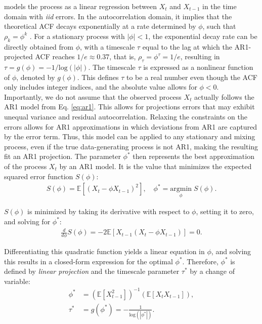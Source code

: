 \documentclass[docs/main.tex]{subfiles}
\begin{document}
\noindent models the process as a linear regression between $X_t$ and $X_{t-1}$ in the time domain with \textit{iid} errors. In the autocorrelation domain, it implies that the theoretical ACF decays exponentially at a rate determined by $\phi$, such that $\rho_k = \phi^k$ \citep[Chapter~14.22]{hansen_econometrics_2022}. For a stationary process with $|\phi|<1$, the exponential decay rate can be directly obtained from $\phi$, with a timescale $\tau$ equal to the lag at which the AR1-projected ACF reaches $1/e\approx 0.37$, that is,  $\rho_\tau = \phi^\tau = 1/e$, resulting in $\tau = g(\phi) = -1/\text{log}(|\phi|)$. The timescale $\tau$ is expressed as a nonlinear function of $\phi$, denoted by $g(\phi)$. This defines $\tau$ to be a real number even though the ACF only includes integer indices, and the absolute value allows for $\phi<0$.\\

Importantly, we do not assume that the observed process $X_t$ actually follows the AR1 model from Eq. \eqref{eq:ar1}. This allows for projections errors that may exhibit unequal variance and residual autocorrelation. Relaxing the constraints on the errors allows for AR1 approximations in which deviations from AR1 are captured by the error term. Thus, this model can be applied to any stationary and mixing process, even if the true data-generating process is not AR1, making the resulting fit an AR1 projection. The parameter $\phi^*$ then represents the best approximation of the process $X_t$ by an AR1 model. It is the value that minimizes the expected squared error function $S(\phi)$:
\begin{align}
    S(\phi) = \mathbb{E}[(X_t - \phi X_{t-1})^2],\quad \phi^* = \underset{\phi}{\text{argmin}} \; S(\phi).
\end{align}

\noindent $S(\phi)$ is minimized by taking its derivative with respect to $\phi$, setting it to zero, and solving for $\phi^*$:
\begin{align}
    \frac{d}{d\phi} S(\phi) = -2 \mathbb{E}[X_{t-1}(X_t - \phi X_{t-1})] = 0.
\end{align}

\noindent Differentiating this quadratic function yields a linear equation in $\phi$, and solving this results in a closed-form expression for the optimal $\phi^*$. Therefore, $\phi^*$ is defined by \textit{linear projection} and the timescale parameter $\tau^*$ by a change of variable:
\begin{align}
    \phi^* &= (\mathbb{E}[X_{t-1}^2])^{-1}(\mathbb{E}[X_t X_{t-1}]) \label{eq:ar1-phi},\\
    \tau^* &= g(\phi^*) = -\frac{1}{\text{log}(|\phi^*|)}. \label{eq:ar1-tau}
\end{align}
\end{document}
